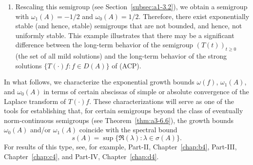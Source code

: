\begin{example}
\begin{enumerate}[\upshape (i), wide, labelindent=.25em]
To see this, consider $E \coloneq C_0(\R_{+}) \cap $ $L^{1}(\R_{+},\eu^{x}\dx)$. 
Then, as shown in Example~\ref{ex:a3-1.3} 
the translation semigroup satisfies $\|T(t)\| = 1$, and hence $\omega_{0}(A) = 0$. 
For every $\lambda \in \C$ with $\Re(\lambda) > -1$ and every $f \in E$, the resolvent of the generator is given as $R(\lambda,A)f = \int_{0}^{\infty} \eu^{\lambda t} T(t)f  \dt$.
From Eq.~, it follows that
\[
T(t)f = \eu^{\lambda t}\left(f - \int_{0}^{t} \eu^{-\lambda s} T(s) (\lambda - A)f  \ds\right),
\]
and from the existence of the limit
\[
\lim_{t \to \infty} \int_{0}^{t} \eu^{-\lambda s} T(s) (\lambda - A)f  \ds,
\] 
it follows that 
$\|T(t)f\| \leq M\eu^{\lambda t}$ for every $f \in D(A)$ and some constant $M$ depending on $f$. This yields $\omega_{1}(A)  \leq -1 < 0 = \omega_{0}(A)$. 
Thus, we have a semigroup that is exponentially stable, but not uniformly exponentially stable.

\item
Rescaling this semigroup (see Section~\ref{subsec:a1-3.2}), we obtain a semigroup with $\omega_{1}(A) = -1/2 $ and $\omega_{0}(A) = 1/2 $.
Therefore, there exist exponentially stable (and hence, stable) semigroups that are not bounded, and hence, not uniformly stable.
This example illustrates that there may be a significant difference between the long-term behavior of the semigroup $(T(t))_{t \geq 0}$ (\ie the set of all mild solutions) and the long-term behavior of the strong solutions $\{T(\cdot)f \colon f \in D(A)\}$ of (ACP). 
\end{enumerate}
\end{example}
In what follows, we characterize the exponential growth bounds $\omega(f)$, $\omega_{1}(A)$, and $\omega_{0}(A)$ in terms of certain abscissas of simple or absolute convergence of the Laplace transform of\/ $T(\cdot)f$. 
These characterizations will serve as one of the tools for 
establishing that, for certain semigroups beyond the class of eventually norm-continuous semigroups (see Theorem~\ref{thm:a3-6.6}), the growth bounds $\omega_{0}(A)$ and/or $\omega_{1}(A)$ coincide with the spectral bound %
\[
	s(A) = \sup\{\Re(\lambda)\colon\lambda \in \sigma(A)\} .
\]
%
For results of this type, see, for example, Part-II, Chapter~\ref{chap:b4},  Part-III, Chapter~\ref{chap:c4},  and Part-IV, Chapter~\ref{chap:d4}.


